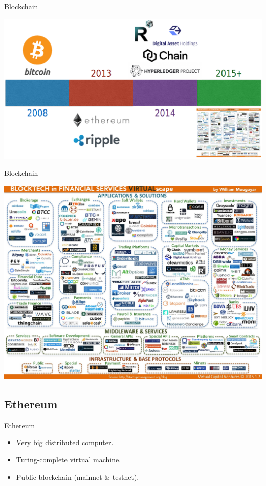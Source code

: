 \documentclass{beamer}
\begin{document}
\begin{frame}{Blockchain}
	\begin{center}
		\includegraphics[width=1\linewidth]{Blockchain-Timeline}
	\end{center}
\end{frame}

\begin{frame}{Blockchain}
	\begin{center}
		\includegraphics[width=1\linewidth]{Blockchain-in-Financial-Services-Landscape}
	\end{center}
\end{frame}

\subsection{Ethereum}

\begin{frame}{Ethereum}
	\begin{itemize}
		\item {
			Very big distributed computer.
		}
		\item {
			Turing-complete virtual machine.
		}
		\item {
			Public blockchain (mainnet \& testnet).
		}
	\end{itemize}
\end{frame}
\end{document}
